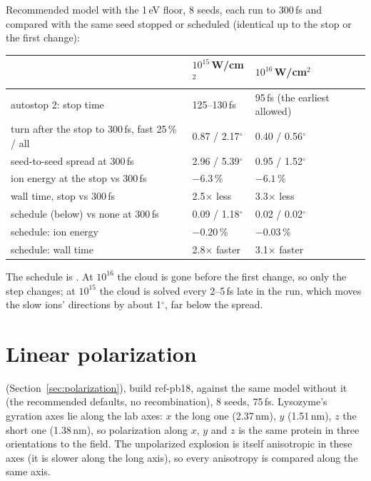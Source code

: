 Recommended model with the 1\,eV floor, 8 seeds, each run to 300\,fs and compared with the same seed stopped or
scheduled (identical up to the stop or the first change):

\begin{table}[H]
\centering\small
\begin{tabularx}{\textwidth}{@{}X l l@{}}
\toprule
 & $10^{15}$\,W/cm$^2$ & $10^{16}$\,W/cm$^2$ \\
\midrule
autostop 2: stop time & 125--130\,fs & 95\,fs (the earliest allowed) \\
turn after the stop to 300\,fs, fast 25\,\% / all & 0.87 / 2.17$^\circ$ & 0.40 / 0.56$^\circ$ \\
seed-to-seed spread at 300\,fs & 2.96 / 5.39$^\circ$ & 0.95 / 1.52$^\circ$ \\
ion energy at the stop vs 300\,fs & $-6.3$\,\% & $-6.1$\,\% \\
wall time, stop vs 300\,fs & 2.5$\times$ less & 3.3$\times$ less \\
\midrule
schedule (below) vs none at 300\,fs & 0.09 / 1.18$^\circ$ & 0.02 / 0.02$^\circ$ \\
schedule: ion energy & $-0.20$\,\% & $-0.03$\,\% \\
schedule: wall time & 2.8$\times$ faster & 3.1$\times$ faster \\
\bottomrule
\end{tabularx}
\end{table}
The schedule is .
At $10^{16}$ the cloud is gone before the first change, so only the step changes; at $10^{15}$ the cloud is solved every
2--5\,fs late in the run, which moves the slow ions' directions by about 1$^\circ$, far below the spread.

\section{Linear polarization}
\label{sec:val-polarization}

 (Section~\ref{sec:polarization}), build ref-pb18, against the same model without it
(the recommended defaults, no recombination), 8 seeds, 75\,fs. Lysozyme's gyration axes lie along the lab axes:
$x$ the long one (2.37\,nm), $y$ (1.51\,nm), $z$ the short one (1.38\,nm), so polarization along $x$, $y$ and $z$ is
the same protein in three orientations to the field. The unpolarized explosion is itself anisotropic in these axes
(it is slower along the long axis), so every anisotropy is compared along the same axis.

